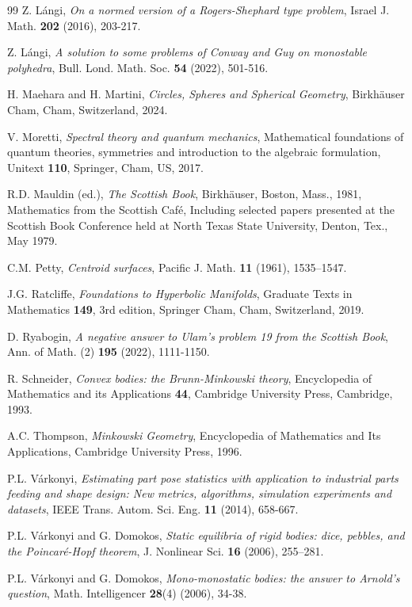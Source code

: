 \documentclass[twoside]{amsart}
\theoremstyle{plain}
\theoremstyle{definition}
\numberwithin{equation}{section}
\begin{document}
\begin{thebibliography}{99}
 Z. L\'angi, \emph{On a normed version of a Rogers-Shephard type problem}, Israel J. Math. \textbf{202} (2016), 203-217.

 Z. L\'angi, \emph{A solution to some problems of Conway and Guy on monostable polyhedra}, Bull. Lond. Math. Soc. \textbf{54} (2022), 501-516.

 H. Maehara and H. Martini, \emph{Circles, Spheres and Spherical Geometry}, Birkh\"auser Cham, Cham, Switzerland, 2024.

 V. Moretti, \emph{Spectral theory and quantum mechanics}, Mathematical foundations of quantum theories, symmetries and introduction to the algebraic formulation, Unitext \textbf{110}, Springer, Cham, US, 2017. 

 R.D. Mauldin (ed.), \emph{The Scottish Book}, Birkh\"auser, Boston, Mass., 1981, Mathematics from the Scottish
Caf\'e, Including selected papers presented at the Scottish Book Conference held at North Texas State University, Denton, Tex., May 1979.

 C.M. Petty, \emph{Centroid surfaces}, Pacific J. Math. \textbf{11} (1961), 1535–1547.

 J.G. Ratcliffe, \emph{Foundations to Hyperbolic Manifolds}, Graduate Texts in Mathematics \textbf{149}, 3rd edition, Springer Cham, Cham, Switzerland, 2019.

 D. Ryabogin, \emph{A negative answer to Ulam's problem 19 from the Scottish Book}, Ann. of Math. (2) \textbf{195} (2022), 1111-1150. 

R. Schneider, \emph{Convex bodies: the Brunn-Minkowski theory}, Encyclopedia of Mathematics and its Applications \textbf{44}, Cambridge University Press, Cambridge, 1993.

 A.C. Thompson, \emph{Minkowski Geometry}, Encyclopedia of Mathematics and Its Applications, Cambridge University Press, 1996.

 P.L. V\'arkonyi, \emph{Estimating part pose statistics with application to industrial parts feeding and shape design: New metrics, algorithms, simulation experiments and datasets}, IEEE Trans. Autom. Sci. Eng. \textbf{11} (2014), 658-667.

 P.L. V\'arkonyi and G. Domokos, \emph{Static equilibria of rigid bodies: dice, pebbles, and the Poincar\'e-Hopf theorem}, J. Nonlinear Sci. \textbf{16} (2006), 255–281.

 P.L. V\'arkonyi and G. Domokos, \emph{Mono-monostatic bodies: the answer to Arnold’s question}, Math. Intelligencer \textbf{28}(4) (2006), 34-38.

\end{thebibliography}
\end{document}
